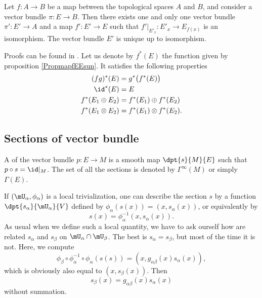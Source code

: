 \begin{proposition}		\label{PropmapfEEsun}
Let $f\colon A\to B$ be a map between the topological spaces $A$ and $B$, and consider a vector bundle $\pi\colon E\to B$. Then there exists one and only one vector bundle $\pi'\colon E'\to A$ and a map $f'\colon E'\to E$ such that $f'|_{E'_x}\colon E'_x\to E_{f(x)}$ is an isomorphism. The vector bundle $E'$ is unique up to isomorphism.
\end{proposition}
Proofs can be found in \cite{VB_and_K}. Let us denote by $f^*(E)$ the function given by proposition \ref{PropmapfEEsun}. It satisfies the following properties
\begin{equation}		\label{EqPropfstarEVect}
\begin{split}
	(fg)^*(E)		&=g^*\big( f^*(E) \big)\\
	\id^*(E)		&=E\\
	f^*(E_1\oplus E_2)	&=f^*(E_1)\oplus f^*(E_2)\\
	f^*(E_1\otimes E_2)	&=f^*(E_1)\otimes f^*(E_2).
\end{split}
\end{equation}



\subsection{Sections of vector bundle}

A  of the vector bundle $p\colon E\to M$ is a smooth map $\dpt{s}{M}{E}$ such that $p\circ s=\id|_M$. The set of all the sections is denoted by $\Gamma^{\infty}(M)$ or simply $\Gamma(E)$.

If $(\mU_{\alpha},\phi_{\alpha})$ is a local trivialization, one can describe the section $s$ by a function $\dpt{s_{\alpha}}{\mU_{\alpha}}{V}$ defined by $\phi_{\alpha}(s(x))=(x,s_{\alpha}(x))$, or equivalently by
\[
s(x)=\phi_{\alpha}^{-1}(x,s_{\alpha}(x)).
\]
As usual when we define such a local quantity, we have to ask ourself how are related $s_{\alpha}$ and $s_{\beta}$ on $\mU_{\alpha}\cap\mU_{\beta}$. The best is $s_{\alpha}=s_{\beta}$, but most of the time it is not. Here, we compute
\[
  \phi_{\beta}\circ\phi_{\alpha}^{-1}\circ\phi_{\alpha}(s(s))=(x,g_{\alpha\beta}(x)s_{\alpha}(x)),
\]
which is obviously also equal to $(x,s_{\beta}(x))$. Then
\begin{equation}\label{eq:tr_sec}
s_{\beta}(x)=g_{\alpha\beta}(x)s_{\alpha}(x)
\end{equation}
without summation.

